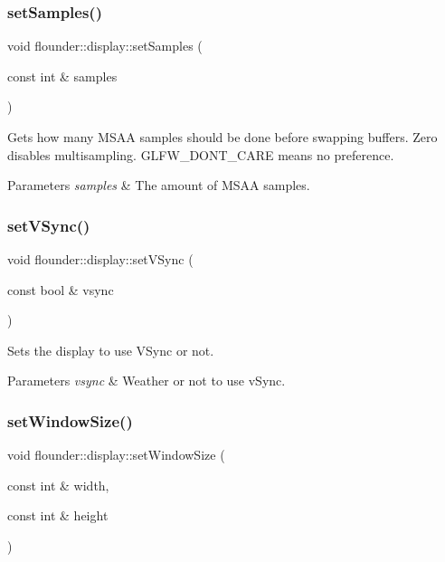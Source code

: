 \subsubsection{\texorpdfstring{set\+Samples()}{setSamples()}}
{\footnotesize\ttfamily void flounder\+::display\+::set\+Samples (\begin{DoxyParamCaption}\item[{const int \&}]{samples }\end{DoxyParamCaption})}



Gets how many M\+S\+AA samples should be done before swapping buffers. Zero disables multisampling. G\+L\+F\+W\+\_\+\+D\+O\+N\+T\+\_\+\+C\+A\+RE means no preference. 


\begin{DoxyParams}{Parameters}
{\em samples} & The amount of M\+S\+AA samples. \\
\hline
\end{DoxyParams}
\mbox{\label{classflounder_1_1display_a172501e1e99cde228d86fab59a3a636b}} 
\subsubsection{\texorpdfstring{set\+V\+Sync()}{setVSync()}}
{\footnotesize\ttfamily void flounder\+::display\+::set\+V\+Sync (\begin{DoxyParamCaption}\item[{const bool \&}]{vsync }\end{DoxyParamCaption})}



Sets the display to use V\+Sync or not. 


\begin{DoxyParams}{Parameters}
{\em vsync} & Weather or not to use v\+Sync. \\
\hline
\end{DoxyParams}
\mbox{\label{classflounder_1_1display_a13edcfe35505b3e164010ed1b232e5d1}} 
\subsubsection{\texorpdfstring{set\+Window\+Size()}{setWindowSize()}}
{\footnotesize\ttfamily void flounder\+::display\+::set\+Window\+Size (\begin{DoxyParamCaption}\item[{const int \&}]{width,  }\item[{const int \&}]{height }\end{DoxyParamCaption})}



